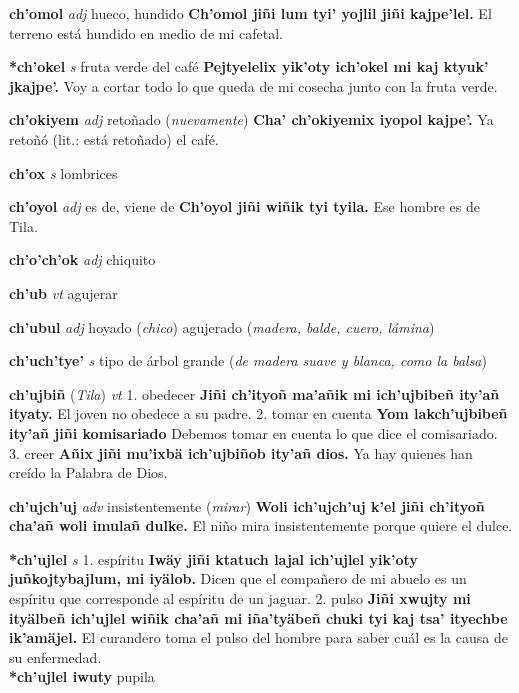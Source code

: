 \documentclass[10pt]{scrbook}
\newcommand{\entry}[1]{\textbf{#1}}
\newcommand{\onedefinition}[1]{#1.}
\newcommand{\partofspeech}[1]{\textit{#1}}
\newcommand{\spanishtranslation}[1]{#1}
\newcommand{\clarification}[1]{(\textit{#1})}
\newcommand{\cholexample}[1]{\textbf{#1}}
\newcommand{\exampletranslation}[1]{#1}
\newcommand{\relevantdialect}[1]{(\textit{#1})}
\newcommand{\secondaryentry}[1]{\\\textbf{#1}}
\newcommand{\secondtranslation}[1]{#1}
\begin{document}
\begin{multicols}{2}
\entry{ch'omol}
\partofspeech{adj}
\spanishtranslation{hueco, hundido}
\cholexample{Ch'omol jiñi lum tyi' yojlil jiñi kajpe'lel.}
\exampletranslation{El terreno está hundido en medio de mi cafetal.}

\entry{*ch'okel}
\partofspeech{s}
\spanishtranslation{fruta verde del café}
\cholexample{Pejtyelelix yik'oty ich'okel mi kaj ktyuk' jkajpe'.}
\exampletranslation{Voy a cortar todo lo que queda de mi cosecha junto con la fruta verde.}

\entry{ch'okiyem}
\partofspeech{adj}
\spanishtranslation{retoñado}
\clarification{nuevamente}
\cholexample{Cha' ch'okiyemix iyopol kajpe'.}
\exampletranslation{Ya retoñó (lit.: está retoñado) el café.}

\entry{ch'ox}
\partofspeech{s}
\spanishtranslation{lombrices}

\entry{ch'oyol}
\partofspeech{adj}
\spanishtranslation{es de, viene de}
\cholexample{Ch'oyol jiñi wiñik tyi tyila.}
\exampletranslation{Ese hombre es de Tila.}

\entry{ch'o'ch'ok}
\partofspeech{adj}
\spanishtranslation{chiquito}

\entry{ch'ub}
\partofspeech{vt}
\spanishtranslation{agujerar}

\entry{ch'ubul}
\partofspeech{adj}
\spanishtranslation{hoyado}
\clarification{chico}
\spanishtranslation{agujerado}
\clarification{madera, balde, cuero, lámina}

\entry{ch'uch'tye'}
\partofspeech{s}
\spanishtranslation{tipo de árbol grande}
\clarification{de madera suave y blanca, como la balsa}

\entry{ch'ujbiñ}
\relevantdialect{Tila}
\partofspeech{vt}
\onedefinition{1}
\spanishtranslation{obedecer}
\cholexample{Jiñi ch'ityoñ ma'añik mi ich'ujbibeñ ity'añ ityaty.}
\exampletranslation{El joven no obedece a su padre.}
\onedefinition{2}
\spanishtranslation{tomar en cuenta}
\cholexample{Yom lakch'ujbibeñ ity'añ jiñi komisariado}
\exampletranslation{Debemos tomar en cuenta lo que dice el comisariado.}
\onedefinition{3}
\spanishtranslation{creer}
\cholexample{Añix jiñi mu'ixbä ich'ujbiñob ity'añ dios.}
\exampletranslation{Ya hay quienes han creído la Palabra de Dios.}

\entry{ch'ujch'uj}
\partofspeech{adv}
\spanishtranslation{insistentemente}
\clarification{mirar}
\cholexample{Woli ich'ujch'uj k'el jiñi ch'ityoñ cha'añ woli imulañ dulke.}
\exampletranslation{El niño mira insistentemente porque quiere el dulce.}

\entry{*ch'ujlel}
\partofspeech{s}
\onedefinition{1}
\spanishtranslation{espíritu}
\cholexample{Iwäy jiñi ktatuch lajal ich'ujlel yik'oty juñkojtybajlum, mi iyälob.}
\exampletranslation{Dicen que el compañero de mi abuelo es un espíritu que corresponde al espíritu de un jaguar.}
\onedefinition{2}
\spanishtranslation{pulso}
\cholexample{Jiñi xwujty mi ityälbeñ ich'ujlel wiñik cha'añ mi iña'tyäbeñ chuki tyi kaj tsa' ityechbe ik'amäjel.}
\exampletranslation{El curandero toma el pulso del hombre para saber cuál es la causa de su enfermedad.}
\secondaryentry{*ch'ujlel iwuty}
\secondtranslation{pupila}


\end{multicols}
\end{document}
